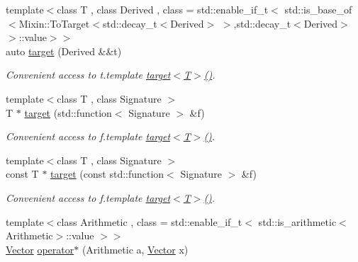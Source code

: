 \begin{DoxyCompactItemize}
\item 
\hypertarget{namespaceSpacy_a84d1790a41a9a5dd65b99ddd231fc652}{}{\footnotesize template$<$class T , class Derived , class  = std\+::enable\+\_\+if\+\_\+t$<$ std\+::is\+\_\+base\+\_\+of$<$\+Mixin\+::\+To\+Target$<$std\+::decay\+\_\+t$<$\+Derived$>$ $>$,std\+::decay\+\_\+t$<$\+Derived$>$$>$\+::value$>$$>$ }\\auto \hyperlink{namespaceSpacy_a84d1790a41a9a5dd65b99ddd231fc652}{target} (Derived \&\&t)\label{namespaceSpacy_a84d1790a41a9a5dd65b99ddd231fc652}

\begin{DoxyCompactList}\small\item\em Convenient access to t.\+template \hyperlink{namespaceSpacy_a84d1790a41a9a5dd65b99ddd231fc652}{target$<$\+T$>$()}. \end{DoxyCompactList}\item 
\hypertarget{namespaceSpacy_a1e53832889e5dc17800d40056fc8940b}{}{\footnotesize template$<$class T , class Signature $>$ }\\T $\ast$ \hyperlink{namespaceSpacy_a1e53832889e5dc17800d40056fc8940b}{target} (std\+::function$<$ Signature $>$ \&f)\label{namespaceSpacy_a1e53832889e5dc17800d40056fc8940b}

\begin{DoxyCompactList}\small\item\em Convenient access to f.\+template \hyperlink{namespaceSpacy_a84d1790a41a9a5dd65b99ddd231fc652}{target$<$\+T$>$()}. \end{DoxyCompactList}\item 
\hypertarget{namespaceSpacy_abbbe651cb37fe1aa14abd4f85f640f6a}{}{\footnotesize template$<$class T , class Signature $>$ }\\const T $\ast$ \hyperlink{namespaceSpacy_abbbe651cb37fe1aa14abd4f85f640f6a}{target} (const std\+::function$<$ Signature $>$ \&f)\label{namespaceSpacy_abbbe651cb37fe1aa14abd4f85f640f6a}

\begin{DoxyCompactList}\small\item\em Convenient access to f.\+template \hyperlink{namespaceSpacy_a84d1790a41a9a5dd65b99ddd231fc652}{target$<$\+T$>$()}. \end{DoxyCompactList}\item 
\hypertarget{namespaceSpacy_ae0a1cbb3d98d6ac0a82727959038f4b4}{}{\footnotesize template$<$class Arithmetic , class  = std\+::enable\+\_\+if\+\_\+t$<$ std\+::is\+\_\+arithmetic$<$\+Arithmetic$>$\+::value $>$$>$ }\\\hyperlink{classSpacy_1_1Vector}{Vector} \hyperlink{namespaceSpacy_ae0a1cbb3d98d6ac0a82727959038f4b4}{operator$\ast$} (Arithmetic a, \hyperlink{classSpacy_1_1Vector}{Vector} x)\label{namespaceSpacy_ae0a1cbb3d98d6ac0a82727959038f4b4}


\end{DoxyCompactItemize}
